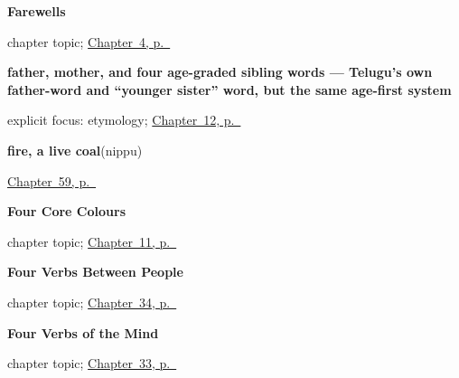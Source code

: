 \noindent\begin{minipage}[t]{\linewidth}
\raggedright
\textbf{Farewells}\par
\footnotesize chapter topic; \hyperref[ch:farewells]{Chapter~4, p.~\pageref*{ch:farewells}}
\end{minipage}\par\smallskip

\noindent\begin{minipage}[t]{\linewidth}
\raggedright
\textbf{father, mother, and four age-graded sibling words — Telugu's own father-word and \textquotedblleft{}younger sister\textquotedblright{} word, but the same age-first system}\enspace\emph{     }\par
\footnotesize explicit focus: etymology; \hyperref[ch:te-family]{Chapter~12, p.~\pageref*{ch:te-family}}
\end{minipage}\par\smallskip

\noindent\begin{minipage}[t]{\linewidth}
\raggedright
\textbf{fire, a live coal}\enspace\emph{}\enspace(nippu)\par
\footnotesize \hyperref[ch:te-weather-ground]{Chapter~59, p.~\pageref*{ch:te-weather-ground}}
\end{minipage}\par\smallskip

\noindent\begin{minipage}[t]{\linewidth}
\raggedright
\textbf{Four Core Colours}\par
\footnotesize chapter topic; \hyperref[ch:te-core-colours]{Chapter~11, p.~\pageref*{ch:te-core-colours}}
\end{minipage}\par\smallskip

\noindent\begin{minipage}[t]{\linewidth}
\raggedright
\textbf{Four Verbs Between People}\par
\footnotesize chapter topic; \hyperref[ch:te-verbs-between-people]{Chapter~34, p.~\pageref*{ch:te-verbs-between-people}}
\end{minipage}\par\smallskip

\noindent\begin{minipage}[t]{\linewidth}
\raggedright
\textbf{Four Verbs of the Mind}\par
\footnotesize chapter topic; \hyperref[ch:te-verbs-of-the-mind]{Chapter~33, p.~\pageref*{ch:te-verbs-of-the-mind}}
\end{minipage}\par\smallskip

